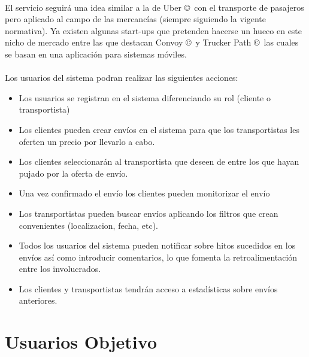 \documentclass[10pt, a4paper,spanish]{article}
\begin{document}
			\paragraph{}
			El servicio seguirá una idea similar a la de Uber \copyright\  con el transporte de pasajeros pero aplicado al campo de las mercancías (siempre siguiendo la vigente normativa). Ya existen algunas start-ups que pretenden hacerse un hueco en este nicho de mercado entre las que destacan Convoy \copyright\ y Trucker Path \copyright\ las cuales se basan en una aplicación para sistemas móviles. \cite{expansion_uber_transporte}

			\paragraph{}
			Los usuarios del sistema podran realizar las siguientes acciones:

			\begin{itemize}

				\item Los usuarios se registran en el sistema diferenciando su rol (cliente o transportista)

				\item Los clientes pueden crear envíos en el sistema para que los transportistas les oferten un precio por llevarlo a cabo.

				\item Los clientes seleccionarán al transportista que deseen de entre los que hayan pujado por la oferta de envío.

				\item Una vez confirmado el envío los clientes pueden monitorizar el envío

				\item Los transportistas pueden buscar envíos aplicando los filtros que crean convenientes (localizacion, fecha, etc).

				\item Todos los usuarios del sistema pueden notificar sobre hitos sucedidos en los envíos así como introducir comentarios, lo que fomenta la retroalimentación entre los involucrados.

				\item Los clientes y transportistas tendrán acceso a estadísticas sobre envíos anteriores.


			\end{itemize}



		\section{Usuarios Objetivo}
\end{document}

